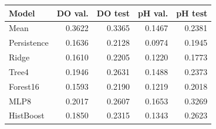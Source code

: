 \begin{tabular}{lrrrr}
\toprule
Model & DO val. & DO test & pH val. & pH test \\
\midrule
Mean & 0.3622 & 0.3365 & 0.1467 & 0.2381 \\
Persistence & 0.1636 & 0.2128 & 0.0974 & 0.1945 \\
Ridge & 0.1610 & 0.2205 & 0.1220 & 0.1773 \\
Tree4 & 0.1946 & 0.2631 & 0.1488 & 0.2373 \\
Forest16 & 0.1593 & 0.2190 & 0.1219 & 0.2018 \\
MLP8 & 0.2017 & 0.2607 & 0.1653 & 0.3269 \\
HistBoost & 0.1850 & 0.2315 & 0.1343 & 0.2623 \\
\bottomrule
\end{tabular}